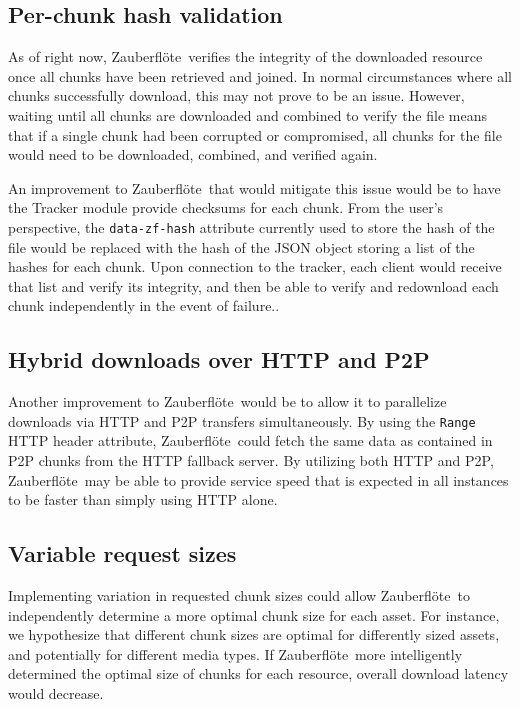\documentclass[letterpaper,twocolumn,10pt]{article}
\newcommand{\zbf}{Zauberfl\"{o}te}
\begin{document}
\subsection{Per-chunk hash validation}
As of right now, \zbf\ verifies the integrity of the downloaded resource once all chunks have been retrieved and joined. In normal circumstances where all chunks successfully download, this may not prove to be an issue. However, waiting until all chunks are downloaded and combined to verify the file means that if a single chunk had been corrupted or compromised, all chunks for the file would need to be downloaded, combined, and verified again.

An improvement to \zbf\ that would mitigate this issue would be to have the Tracker module provide checksums for each chunk. From the user's perspective, the \texttt{data-zf-hash} attribute currently used to store the hash of the file would be replaced with the hash of the JSON object storing a list of the hashes for each chunk. Upon connection to the tracker, each client would receive that list and verify its integrity, and then be able to verify and redownload each chunk independently in the event of failure.. 

\subsection{Hybrid downloads over HTTP and P2P}

Another improvement to \zbf\ would be to allow it to parallelize downloads via HTTP and P2P transfers simultaneously. By using the \texttt{Range} HTTP header attribute, \zbf\ could fetch the same data as contained in P2P chunks from the HTTP fallback server. By utilizing both HTTP and P2P, \zbf\ may be able to provide service speed that is expected in all instances to be faster than simply using HTTP alone.

\subsection{Variable request sizes}

Implementing variation in requested chunk sizes could allow \zbf\ to independently
determine a more optimal chunk size for each asset. For instance, we hypothesize
that different chunk sizes are optimal for differently sized assets, and potentially
for different media types. If \zbf\ more intelligently determined the optimal size
of chunks for each resource, overall download latency would decrease.
\end{document}
